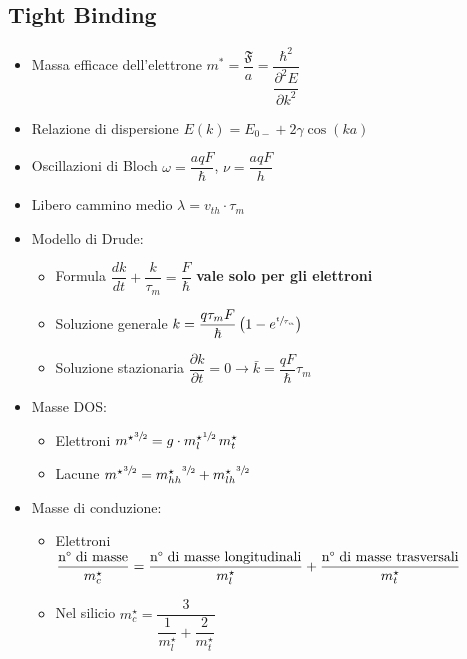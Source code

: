 \documentclass{article}
\begin{document}
\subsection{Tight Binding}
\begin{itemize}
  \item Massa efficace dell'elettrone \( m ^ \ast = \dfrac{ \mathfrak{F} }{a} = \dfrac{\hbar ^ 2}{\dfrac{\partial ^ 2 E}{\partial k ^ 2}} \)
  \item Relazione di dispersione \( E(k) = E_{0-} + 2 \gamma \cos(ka) \)
  \item Oscillazioni di Bloch \( \omega = \dfrac{a q F}{\hbar} \), \( \nu = \dfrac{a q F}{h} \)
  \item Libero cammino medio \( \lambda = v_{th} \cdot \tau_m \)
  \item Modello di Drude:
        \begin{itemize}
          \item Formula \( \dfrac{dk}{dt} + \dfrac{k}{\tau_m}= \dfrac{F}{\hbar} \) \textbf{vale solo per gli elettroni}
          \item Soluzione generale \( k = \dfrac{q \tau_m F}{\hbar} \left( 1 - e^{\sfrac{t}{\tau_m}} \right) \)
          \item Soluzione stazionaria \( \dfrac{\partial k}{\partial t} = 0 \rightarrow \bar{k} = \dfrac{q F}{\hbar} \tau_m \)
        \end{itemize}
  \item Masse DOS:
        \begin{itemize}
          \item Elettroni \( {m^\star} ^ {\sfrac{3}{2}} = g \cdot {m^\star_l} ^ {\sfrac{1}{2}} \, m^\star_t \)
          \item Lacune \( {m^\star} ^ {\sfrac{3}{2}} = {m^\star_{hh}} ^ {\sfrac{3}{2}} + {m^\star_{lh}} ^ {\sfrac{3}{2}} \)
        \end{itemize}
  \item Masse di conduzione:
        \begin{itemize}
          \item Elettroni \( \dfrac{\textnormal{n° di masse}}{m_c^\star} = \dfrac{\textnormal{n° di masse longitudinali}}{m_l^\star} + \dfrac{\textnormal{n° di masse trasversali}}{m_t^\star}\)
          \item Nel silicio \( m_c^\star = \dfrac{3}{\dfrac{1}{m_l^\star} + \dfrac{2}{m_t^\star}} \)
        \end{itemize}
\end{itemize}
\end{document}
